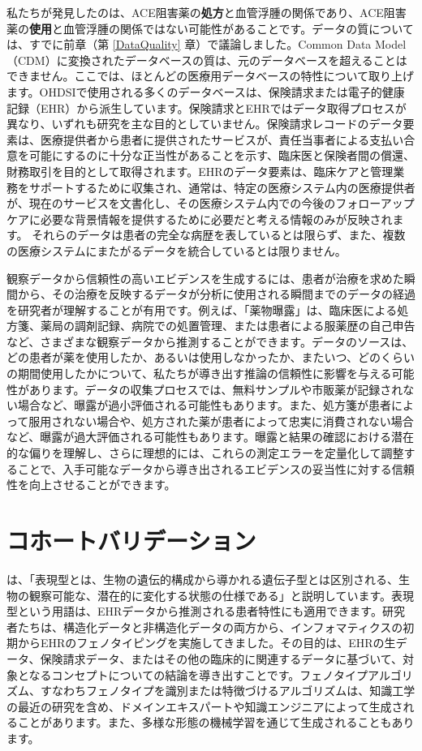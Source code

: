 \documentclass[
  11pt]{book}
\theoremstyle{definition}
\theoremstyle{definition}
\theoremstyle{definition}
\theoremstyle{definition}
\theoremstyle{remark}
\begin{document}
私たちが発見したのは、ACE阻害薬の\textbf{処方}と血管浮腫の関係であり、ACE阻害薬の\textbf{使用}と血管浮腫の関係ではない可能性があることです。データの質については、すでに前章（第 \ref{DataQuality} 章）で議論しました。Common Data Model（CDM）に変換されたデータベースの質は、元のデータベースを超えることはできません。ここでは、ほとんどの医療用データベースの特性について取り上げます。OHDSIで使用される多くのデータベースは、保険請求または電子的健康記録（EHR）から派生しています。保険請求とEHRではデータ取得プロセスが異なり、いずれも研究を主な目的としていません。保険請求レコードのデータ要素は、医療提供者から患者に提供されたサービスが、責任当事者による支払い合意を可能にするのに十分な正当性があることを示す、臨床医と保険者間の償還、財務取引を目的として取得されます。EHRのデータ要素は、臨床ケアと管理業務をサポートするために収集され、通常は、特定の医療システム内の医療提供者が、現在のサービスを文書化し、その医療システム内での今後のフォローアップケアに必要な背景情報を提供するために必要だと考える情報のみが反映されます。 それらのデータは患者の完全な病歴を表しているとは限らず、また、複数の医療システムにまたがるデータを統合しているとは限りません。

観察データから信頼性の高いエビデンスを生成するには、患者が治療を求めた瞬間から、その治療を反映するデータが分析に使用される瞬間までのデータの経過を研究者が理解することが有用です。例えば、「薬物曝露」は、臨床医による処方箋、薬局の調剤記録、病院での処置管理、または患者による服薬歴の自己申告など、さまざまな観察データから推測することができます。データのソースは、どの患者が薬を使用したか、あるいは使用しなかったか、またいつ、どのくらいの期間使用したかについて、私たちが導き出す推論の信頼性に影響を与える可能性があります。データの収集プロセスでは、無料サンプルや市販薬が記録されない場合など、曝露が過小評価される可能性もあります。また、処方箋が患者によって服用されない場合や、処方された薬が患者によって忠実に消費されない場合など、曝露が過大評価される可能性もあります。曝露と結果の確認における潜在的な偏りを理解し、さらに理想的には、これらの測定エラーを定量化して調整することで、入手可能なデータから導き出されるエビデンスの妥当性に対する信頼性を向上させることができます。

\section{コホートバリデーション}\label{CohortValidation}

\citet{hripcsak_2017} は、「表現型とは、生物の遺伝的構成から導かれる遺伝子型とは区別される、生物の観察可能な、潜在的に変化する状態の仕様である」と説明しています。表現型という用語は、EHRデータから推測される患者特性にも適用できます。研究者たちは、構造化データと非構造化データの両方から、インフォマティクスの初期からEHRのフェノタイピングを実施してきました。その目的は、EHRの生データ、保険請求データ、またはその他の臨床的に関連するデータに基づいて、対象となるコンセプトについての結論を導き出すことです。フェノタイプアルゴリズム、すなわちフェノタイプを識別または特徴づけるアルゴリズムは、知識工学の最近の研究を含め、ドメインエキスパートや知識エンジニアによって生成されることがあります。また、多様な形態の機械学習を通じて生成されることもあります。
\end{document}
